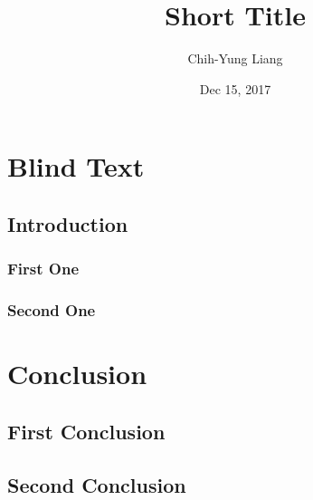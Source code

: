 \documentclass[12pt]{article}
\title{Short Title}{Research Diary - Full Title}
\date{Dec 15, 2017}
\author{Chih-Yung Liang}
\begin{document}
\maketitle

\section*{Blind Text}
\blindtext

\subsection*{Introduction}
\blindtext

\blindtext

\subsubsection*{First One}
\blindtext

\subsubsection*{Second One}
\blindtext

\section*{Conclusion}
\subsection*{First Conclusion}
\blindtext

\subsection*{Second Conclusion}
\blindtext
\end{document}
